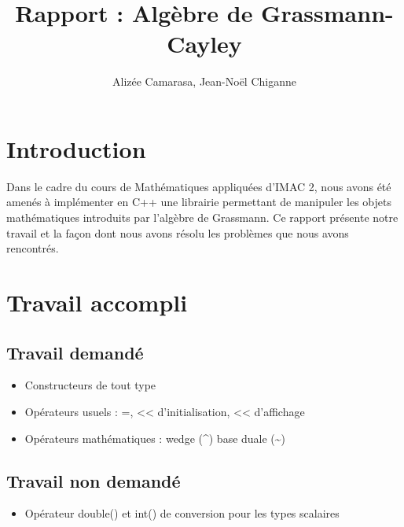 \documentclass[12pt]{article}
\begin{document}
\pagestyle{headings}

\title{Rapport : Algèbre de Grassmann-Cayley}
\author{Alizée Camarasa, Jean-Noël Chiganne}
\maketitle
\newpage
\tableofcontents

\newpage
\section{Introduction}
Dans le cadre du cours de Mathématiques appliquées d'IMAC 2, nous avons été amenés à implémenter en C++ une librairie permettant de manipuler les objets mathématiques introduits par l'algèbre de Grassmann.
Ce rapport présente notre travail et la façon dont nous avons résolu les problèmes que nous avons rencontrés.


\newpage
\section{Travail accompli}
\subsection{Travail demandé}
\begin{itemize}
\item Constructeurs de tout type
\item Opérateurs usuels :  =, << d'initialisation, << d'affichage
\item Opérateurs mathématiques : wedge (\textasciicircum) base duale (\textasciitilde)
\end{itemize}

\subsection{Travail non demandé}
\begin{itemize}
\item Opérateur double() et int() de conversion pour les types scalaires
\end{itemize}
\end{document}
